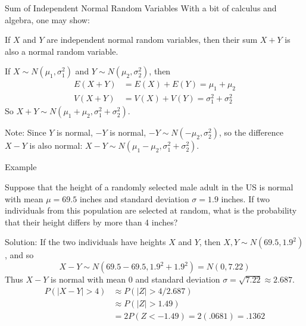 \documentclass[xcolor=table]{beamer}
\begin{document}
\begin{frame}{Sum of Independent Normal Random Variables}
With a bit of calculus and algebra, one may show:
\begin{block}{}
If $X$ and $Y$ are independent normal random variables, 
then their sum $X+Y$ is also a normal random variable.
\end{block}
\pause If $X\sim N(\mu_1,\sigma_1^2)$ and $Y\sim N(\mu_2,\sigma_2^2)$, then
\begin{align*}
E(X+Y)&=E(X)+E(Y)=\mu_1+\mu_2 \\
V(X+Y)&=V(X)+V(Y)=\sigma_1^2+\sigma_2^2
\end{align*}
So $X+Y\sim N(\mu_1+\mu_2,\sigma_1^2+\sigma_2^2)$.

\vspace{.2cm}
\pause Note: Since $Y$ is normal, $-Y$ is normal, $-Y\sim N(-\mu_2,\sigma_2^2)$, so the difference $X-Y$ is also normal: $X-Y\sim N(\mu_1-\mu_2,\sigma_1^2+\sigma_2^2)$.

\end{frame}


\begin{frame}{Example}
\begin{block}{}
Suppose that the height of a randomly selected male adult in the US is normal with mean $\mu=69.5$ inches and standard deviation $\sigma=1.9$ inches. If two individuals from this population are selected at random, what is the probability that their height differs by more than 4 inches?
\end{block}
\pause Solution: If the two individuals have heights $X$ and $Y$, then $X, Y\sim N(69.5,1.9^2)$, and so $$X-Y \sim N(69.5-69.5, 1.9^2+1.9^2) = N(0,7.22)$$
\pause Thus $X-Y$ is normal with mean 0 and standard deviation $\sigma=\sqrt{7.22}\approx 2.687$.
\pause \begin{align*}
P(|X-Y| > 4) &\approx P(|Z| > 4/2.687) \\
&\approx P(|Z| > 1.49) \\
&= 2P(Z<-1.49) = 2(.0681) = .1362
\end{align*}
\end{frame}
\end{document}

